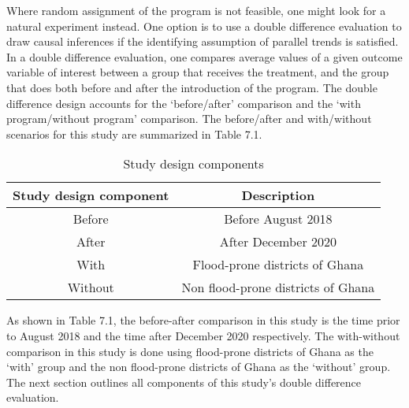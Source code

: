Where random assignment of the program is not feasible, one might look for a natural experiment instead.  One option is to use a double difference evaluation to draw causal inferences if the identifying assumption of parallel trends is satisfied. In a double difference evaluation, one compares average values of a given outcome variable of interest between a group that receives the treatment, and the group that does both before and after the introduction of the program. The double difference design accounts for the ‘before/after’ comparison and the ‘with program/without program’ comparison. The before/after and with/without scenarios for this study are summarized in Table 7.1.\\

\begin{table}
\centering
\begin{tabular}{|c|c|}
\hline
\textbf{Study design component} & \textbf{Description}\\
\hline
Before\rule{0pt}{4ex} & Before August 2018 \\
After\rule{0pt}{4ex} & After December 2020 \\
With\rule{0pt}{4ex} & Flood-prone districts of Ghana \\
Without\rule{0pt}{4ex} & Non flood-prone districts of Ghana \\
\hline
\end{tabular}
\caption{Study design components}
\end{table}

As shown in Table 7.1, the before-after comparison in this study is the time prior to August 2018 and the time after December 2020 respectively. The with-without comparison in this study is done using flood-prone districts of Ghana as the ‘with’ group and the non flood-prone districts of Ghana as the ‘without’ group.\\

The next section outlines all components of this study’s double difference evaluation.
